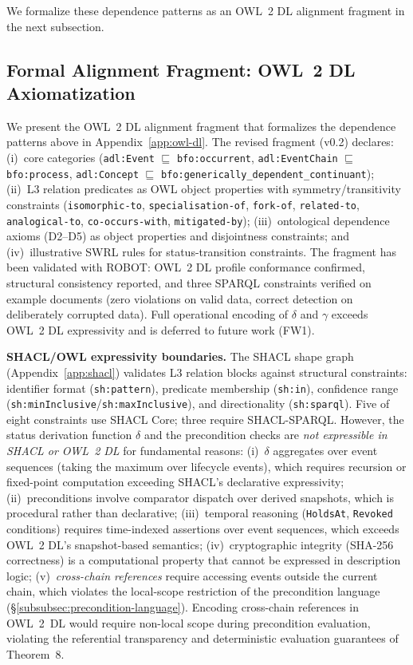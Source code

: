 We formalize these dependence patterns as an OWL~2 DL alignment fragment in the next subsection.

\subsection{Formal Alignment Fragment: OWL~2 DL Axiomatization}\label{subsec:formal-alignment}

We present the OWL~2 DL alignment fragment that formalizes the dependence patterns above in Appendix~\ref{app:owl-dl}. The revised fragment (v0.2) declares: (i)~core categories (\texttt{adl:Event} $\sqsubseteq$ \texttt{bfo:occurrent}, \texttt{adl:EventChain} $\sqsubseteq$ \texttt{bfo:process}, \texttt{adl:Concept} $\sqsubseteq$ \texttt{bfo:generically\_dependent\_continuant}); (ii)~L3 relation predicates as OWL object properties with symmetry/transitivity constraints (\texttt{isomorphic-to}, \texttt{specialisation-of}, \texttt{fork-of}, \texttt{related-to}, \texttt{analogical-to}, \texttt{co-occurs-with}, \texttt{mitigated-by}); (iii)~ontological dependence axioms (D2--D5) as object properties and disjointness constraints; and (iv)~illustrative SWRL rules for status-transition constraints. The fragment has been validated with ROBOT: OWL~2 DL profile conformance confirmed, structural consistency reported, and three SPARQL constraints verified on example documents (zero violations on valid data, correct detection on deliberately corrupted data). Full operational encoding of $\delta$ and $\gamma$ exceeds OWL~2 DL expressivity and is deferred to future work (FW1).

\textbf{SHACL/OWL expressivity boundaries.} The SHACL shape graph (Appendix~\ref{app:shacl}) validates L3 relation blocks against structural constraints: identifier format (\texttt{sh:pattern}), predicate membership (\texttt{sh:in}), confidence range (\texttt{sh:minInclusive}/\texttt{sh:maxInclusive}), and directionality (\texttt{sh:sparql}). Five of eight constraints use SHACL Core; three require SHACL-SPARQL. However, the status derivation function $\delta$ and the precondition checks are \emph{not expressible in SHACL or OWL~2 DL} for fundamental reasons: (i)~$\delta$ aggregates over event sequences (taking the maximum over lifecycle events), which requires recursion or fixed-point computation exceeding SHACL's declarative expressivity; (ii)~preconditions involve comparator dispatch over derived snapshots, which is procedural rather than declarative; (iii)~temporal reasoning (\texttt{HoldsAt}, \texttt{Revoked} conditions) requires time-indexed assertions over event sequences, which exceeds OWL~2 DL's snapshot-based semantics; (iv)~cryptographic integrity (SHA-256 correctness) is a computational property that cannot be expressed in description logic; (v)~\emph{cross-chain references} require accessing events outside the current chain, which violates the local-scope restriction of the precondition language (\S\ref{subsubsec:precondition-language}). Encoding cross-chain references in OWL~2~DL would require non-local scope during precondition evaluation, violating the referential transparency and deterministic evaluation guarantees of Theorem~8.

